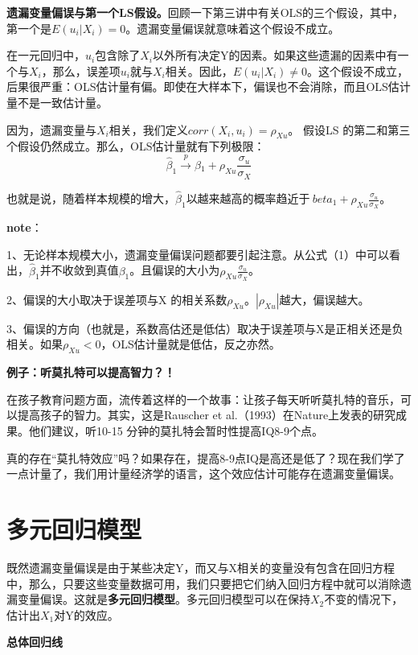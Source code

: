 \documentclass[cn,12pt,math=newtx,citestyle=gb7714-2015,bibstyle=gb7714-2015]{elegantbook}
\begin{document}
	\textbf{遗漏变量偏误与第一个LS假设。}回顾一下第三讲中有关OLS的三个假设，其中，第一个是$E(u_i|X_i)=0$。遗漏变量偏误就意味着这个假设不成立。
	
	在一元回归中，$u_i$包含除了$X_i$以外所有决定Y的因素。如果这些遗漏的因素中有一个与$X_i$，那么，误差项$u_i$就与$X_i$相关。因此，$E(u_i|X_i)\neq0$。这个假设不成立，后果很严重：OLS估计量有偏。即使在大样本下，偏误也不会消除，而且OLS估计量不是一致估计量。
	
	因为，遗漏变量与$X_i$相关，我们定义$corr(X_i,u_i)=\rho_{Xu}$。 假设LS 的第二和第三个假设仍然成立。那么，OLS估计量就有下列极限：
	\begin{equation}
		\hat{\beta}_1\xrightarrow{p}\beta{_1}+\rho_{Xu}\frac{\sigma{_u}}{\sigma{_X}}
	\end{equation}
	
	也就是说，随着样本规模的增大，$\hat{\beta}_1$以越来越高的概率趋近于$\ beta{_1}+\rho_{Xu}\frac{\sigma{_u}}{\sigma{_X}}$。
	
	\textbf{note}：
	
	1、无论样本规模大小，遗漏变量偏误问题都要引起注意。从公式（1）中可以看出，$\hat{\beta}_1$并不收敛到真值$\beta_1$。且偏误的大小为$\rho_{Xu}\frac{\sigma{_u}}{\sigma{_X}}$。
	
	2、偏误的大小取决于误差项与X 的相关系数$\rho_{Xu}$。$|\rho_{Xu}|$越大，偏误越大。
	
	3、偏误的方向（也就是，系数高估还是低估）取决于误差项与X是正相关还是负相关。如果$\rho_{Xu}<0$，OLS估计量就是低估，反之亦然。
	
	\textbf{例子：听莫扎特可以提高智力？！}
	
	在孩子教育问题方面，流传着这样的一个故事：让孩子每天听听莫扎特的音乐，可以提高孩子的智力。其实，这是Rauscher et al.（1993）在Nature上发表的研究成果。他们建议，听10-15 分钟的莫扎特会暂时性提高IQ8-9个点。
	
	真的存在“莫扎特效应”吗？如果存在，提高8-9点IQ是高还是低了？现在我们学了一点计量了，我们用计量经济学的语言，这个效应估计可能存在遗漏变量偏误。
	
	\section{多元回归模型}
	既然遗漏变量偏误是由于某些决定Y，而又与X相关的变量没有包含在回归方程中，那么，只要这些变量数据可用，我们只要把它们纳入回归方程中就可以消除遗漏变量偏误。这就是\textbf{多元回归模型}。多元回归模型可以在保持$X_2$不变的情况下，估计出$X_1$对Y的效应。
	
	\textbf{总体回归线}
	
\end{document}
